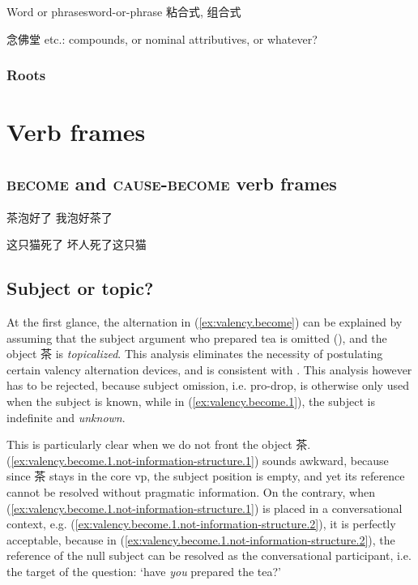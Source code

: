 \documentclass[UTF8, a4paper, oneside, scheme=plain, 12pt]{ctexrep}
\newcommand{\translate}[1]{`#1'}
\newcommand*{\category}[1]{\textsc{#1}}
\begin{document}
\begin{todobox}{Word or phrases}{word-or-phrase}
    粘合式, 组合式

    念佛堂 etc.: compounds, or nominal attributives, or whatever?
\end{todobox}

\subsection{Roots}

\chapter{Verb frames}

\section{\category{become} and \category{cause}-\category{become} verb frames}

\begin{exe}
    \ex\label{ex:valency.become} \begin{xlist}
        \ex\label{ex:valency.become.1} 茶泡好了
        \ex 我泡好茶了
    \end{xlist}

    \ex\label{ex:valency.become-only}
    \begin{xlist}
        \ex\label{ex:valency.become-only.1} 这只猫死了
        \ex *坏人死了这只猫
    \end{xlist}
\end{exe}

\section{Subject or topic?}\label{sec:valency.become.subject-or-topic}

At the first glance, the alternation in (\ref{ex:valency.become})
can be explained by assuming that the 
subject argument who prepared tea is omitted (),
and the object 茶 is \emph{topicalized}.
This analysis eliminates the necessity of postulating certain valency alternation devices,
and is consistent with \citet{lapolla20091}.
This analysis however has to be rejected,
because subject omission, i.e. pro-drop,
is otherwise only used when the subject is known,
while in (\ref{ex:valency.become.1}),
the subject is indefinite and \emph{unknown}.

This is particularly clear when we do not front the object 茶.
(\ref{ex:valency.become.1.not-information-structure.1}) sounds awkward,
because since 茶 stays in the core \ac{vp},
the subject position is empty, and yet its reference cannot be resolved
without pragmatic information.
On the contrary, when (\ref{ex:valency.become.1.not-information-structure.1})
is placed in a conversational context,
e.g. (\ref{ex:valency.become.1.not-information-structure.2}),
it is perfectly acceptable, because in (\ref{ex:valency.become.1.not-information-structure.2}),
the reference of the null subject can be resolved as the conversational participant,
i.e. the target of the question:
\translate{have \emph{you} prepared the tea?}
\end{document}
